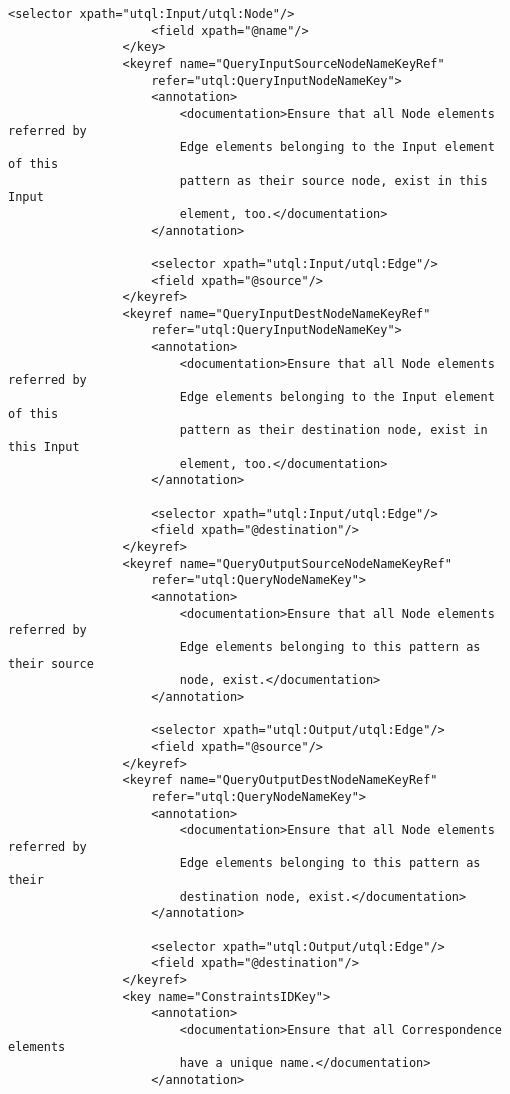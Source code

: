 \documentclass[11pt]{article}
\begin{document}
\begin{Verbatim}[fontsize=\footnotesize,tabsize=2]
                    <selector xpath="utql:Input/utql:Node"/>
                    <field xpath="@name"/>
                </key>
				<keyref name="QueryInputSourceNodeNameKeyRef"
					refer="utql:QueryInputNodeNameKey">
					<annotation>
                        <documentation>Ensure that all Node elements referred by
                        Edge elements belonging to the Input element of this
                        pattern as their source node, exist in this Input
                        element, too.</documentation>
                    </annotation>
                    
                    <selector xpath="utql:Input/utql:Edge"/>
                    <field xpath="@source"/>
                </keyref>
                <keyref name="QueryInputDestNodeNameKeyRef"
                    refer="utql:QueryInputNodeNameKey">
                    <annotation>
                        <documentation>Ensure that all Node elements referred by
                        Edge elements belonging to the Input element of this
                        pattern as their destination node, exist in this Input
                        element, too.</documentation>
                    </annotation>
                    
                    <selector xpath="utql:Input/utql:Edge"/>
                    <field xpath="@destination"/>
                </keyref> 
                <keyref name="QueryOutputSourceNodeNameKeyRef"
                    refer="utql:QueryNodeNameKey">
                    <annotation>
                        <documentation>Ensure that all Node elements referred by
                        Edge elements belonging to this pattern as their source
                        node, exist.</documentation>
                    </annotation>
                    
                    <selector xpath="utql:Output/utql:Edge"/>
                    <field xpath="@source"/>
                </keyref>
                <keyref name="QueryOutputDestNodeNameKeyRef"
                    refer="utql:QueryNodeNameKey">
                    <annotation>
                        <documentation>Ensure that all Node elements referred by
                        Edge elements belonging to this pattern as their
                        destination node, exist.</documentation>
                    </annotation>
                    
                    <selector xpath="utql:Output/utql:Edge"/>
                    <field xpath="@destination"/>
                </keyref>
                <key name="ConstraintsIDKey">
                    <annotation>
                        <documentation>Ensure that all Correspondence elements
                        have a unique name.</documentation>
                    </annotation>
                    

\end{Verbatim}
\end{document}
